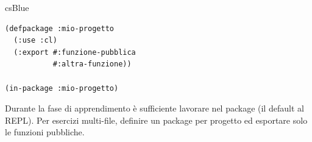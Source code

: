 \begin{refbox}[Package]{csBlue}
\label{sec:package}

\begin{lstlisting}
(defpackage :mio-progetto
  (:use :cl)
  (:export #:funzione-pubblica
           #:altra-funzione))

(in-package :mio-progetto)
\end{lstlisting}

Durante la fase di apprendimento è sufficiente lavorare nel
package  (il default al REPL).
Per esercizi multi-file, definire un package per progetto
ed esportare solo le funzioni pubbliche.

\end{refbox}
